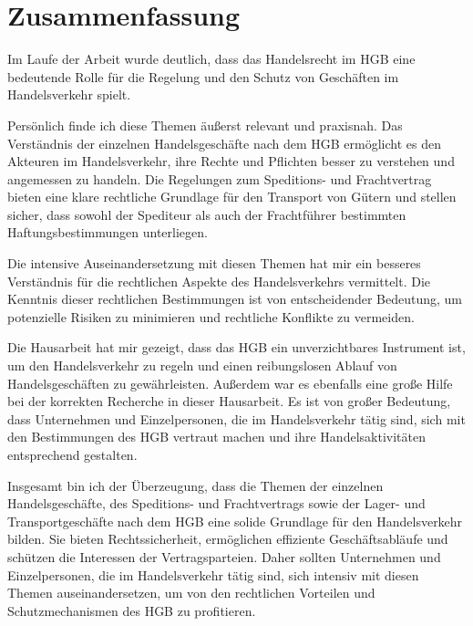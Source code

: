 \chapter{Zusammenfassung}

Im Laufe der Arbeit wurde deutlich, dass das Handelsrecht im HGB eine bedeutende Rolle für die Regelung und den Schutz von Geschäften im Handelsverkehr spielt.

Persönlich finde ich diese Themen äußerst relevant und praxisnah. Das Verständnis der einzelnen Handelsgeschäfte nach dem HGB ermöglicht es den Akteuren im Handelsverkehr, ihre Rechte und Pflichten besser zu verstehen und angemessen zu handeln. Die Regelungen zum Speditions- und Frachtvertrag bieten eine klare rechtliche Grundlage für den Transport von Gütern und stellen sicher, dass sowohl der Spediteur als auch der Frachtführer bestimmten Haftungsbestimmungen unterliegen.

Die intensive Auseinandersetzung mit diesen Themen hat mir ein besseres Verständnis für die rechtlichen Aspekte des Handelsverkehrs vermittelt. Die Kenntnis dieser rechtlichen Bestimmungen ist von entscheidender Bedeutung, um potenzielle Risiken zu minimieren und rechtliche Konflikte zu vermeiden.

Die Hausarbeit hat mir gezeigt, dass das HGB ein unverzichtbares Instrument ist, um den Handelsverkehr zu regeln und einen reibungslosen Ablauf von Handelsgeschäften zu gewährleisten. Außerdem war es ebenfalls eine große Hilfe bei der korrekten Recherche in dieser Hausarbeit. Es ist von großer Bedeutung, dass Unternehmen und Einzelpersonen, die im Handelsverkehr tätig sind, sich mit den Bestimmungen des HGB vertraut machen und ihre Handelsaktivitäten entsprechend gestalten.

Insgesamt bin ich der Überzeugung, dass die Themen der einzelnen Handelsgeschäfte, des Speditions- und Frachtvertrags sowie der Lager- und Transportgeschäfte nach dem HGB eine solide Grundlage für den Handelsverkehr bilden. Sie bieten Rechtssicherheit, ermöglichen effiziente Geschäftsabläufe und schützen die Interessen der Vertragsparteien. Daher sollten Unternehmen und Einzelpersonen, die im Handelsverkehr tätig sind, sich intensiv mit diesen Themen auseinandersetzen, um von den rechtlichen Vorteilen und Schutzmechanismen des HGB zu profitieren.


